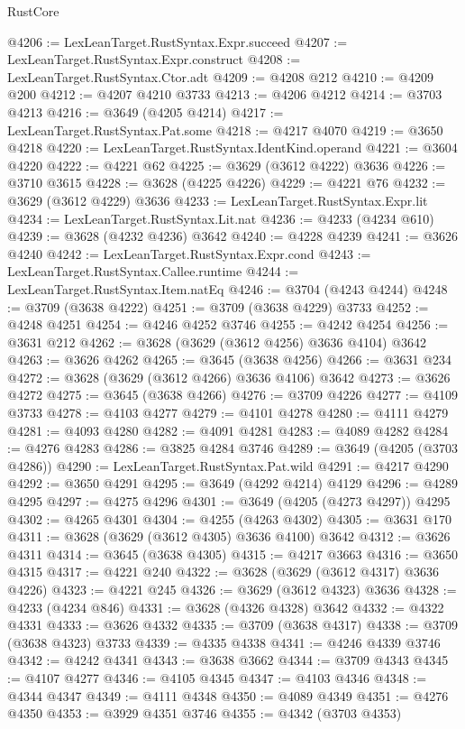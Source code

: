 \begin{lexlean}{RustCore}
\begin{coremodule}
@4206 := LexLeanTarget.RustSyntax.Expr.succeed
@4207 := LexLeanTarget.RustSyntax.Expr.construct
@4208 := LexLeanTarget.RustSyntax.Ctor.adt
@4209 := @4208 @212
@4210 := @4209 @200
@4212 := @4207 @4210 @3733
@4213 := @4206 @4212
@4214 := @3703 @4213
@4216 := @3649 (@4205 @4214)
@4217 := LexLeanTarget.RustSyntax.Pat.some
@4218 := @4217 @4070
@4219 := @3650 @4218
@4220 := LexLeanTarget.RustSyntax.IdentKind.operand
@4221 := @3604 @4220
@4222 := @4221 @62
@4225 := @3629 (@3612 @4222) @3636
@4226 := @3710 @3615
@4228 := @3628 (@4225 @4226)
@4229 := @4221 @76
@4232 := @3629 (@3612 @4229) @3636
@4233 := LexLeanTarget.RustSyntax.Expr.lit
@4234 := LexLeanTarget.RustSyntax.Lit.nat
@4236 := @4233 (@4234 @610)
@4239 := @3628 (@4232 @4236) @3642
@4240 := @4228 @4239
@4241 := @3626 @4240
@4242 := LexLeanTarget.RustSyntax.Expr.cond
@4243 := LexLeanTarget.RustSyntax.Callee.runtime
@4244 := LexLeanTarget.RustSyntax.Item.natEq
@4246 := @3704 (@4243 @4244)
@4248 := @3709 (@3638 @4222)
@4251 := @3709 (@3638 @4229) @3733
@4252 := @4248 @4251
@4254 := @4246 @4252 @3746
@4255 := @4242 @4254
@4256 := @3631 @212
@4262 := @3628 (@3629 (@3612 @4256) @3636 @4104) @3642
@4263 := @3626 @4262
@4265 := @3645 (@3638 @4256)
@4266 := @3631 @234
@4272 := @3628 (@3629 (@3612 @4266) @3636 @4106) @3642
@4273 := @3626 @4272
@4275 := @3645 (@3638 @4266)
@4276 := @3709 @4226
@4277 := @4109 @3733
@4278 := @4103 @4277
@4279 := @4101 @4278
@4280 := @4111 @4279
@4281 := @4093 @4280
@4282 := @4091 @4281
@4283 := @4089 @4282
@4284 := @4276 @4283
@4286 := @3825 @4284 @3746
@4289 := @3649 (@4205 (@3703 @4286))
@4290 := LexLeanTarget.RustSyntax.Pat.wild
@4291 := @4217 @4290
@4292 := @3650 @4291
@4295 := @3649 (@4292 @4214) @4129
@4296 := @4289 @4295
@4297 := @4275 @4296
@4301 := @3649 (@4205 (@4273 @4297)) @4295
@4302 := @4265 @4301
@4304 := @4255 (@4263 @4302)
@4305 := @3631 @170
@4311 := @3628 (@3629 (@3612 @4305) @3636 @4100) @3642
@4312 := @3626 @4311
@4314 := @3645 (@3638 @4305)
@4315 := @4217 @3663
@4316 := @3650 @4315
@4317 := @4221 @240
@4322 := @3628 (@3629 (@3612 @4317) @3636 @4226)
@4323 := @4221 @245
@4326 := @3629 (@3612 @4323) @3636
@4328 := @4233 (@4234 @846)
@4331 := @3628 (@4326 @4328) @3642
@4332 := @4322 @4331
@4333 := @3626 @4332
@4335 := @3709 (@3638 @4317)
@4338 := @3709 (@3638 @4323) @3733
@4339 := @4335 @4338
@4341 := @4246 @4339 @3746
@4342 := @4242 @4341
@4343 := @3638 @3662
@4344 := @3709 @4343
@4345 := @4107 @4277
@4346 := @4105 @4345
@4347 := @4103 @4346
@4348 := @4344 @4347
@4349 := @4111 @4348
@4350 := @4089 @4349
@4351 := @4276 @4350
@4353 := @3929 @4351 @3746
@4355 := @4342 (@3703 @4353)

\end{coremodule}
\end{lexlean}
